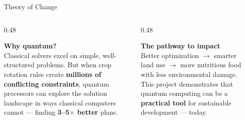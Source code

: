 \documentclass[aspectratio=169,10pt]{beamer}
\begin{document}
\begin{frame}{Theory of Change}

    \vspace{0.4cm}
    \begin{columns}[T]
        \begin{column}{0.48\textwidth}
            \begin{keybox}
                \centering\small
                \textbf{Why quantum?}\\[3pt]
                \scriptsize Classical solvers excel on simple, well-structured problems.
                But when crop rotation rules create \textbf{millions of conflicting constraints},
                quantum processors can explore the solution landscape in ways
                classical computers cannot --- finding \textbf{3--5$\times$ better} plans.
            \end{keybox}
        \end{column}
        \begin{column}{0.48\textwidth}
            \begin{resultbox}
                \centering\small
                \textbf{The pathway to impact}\\[3pt]
                \scriptsize Better optimization $\rightarrow$ smarter land use $\rightarrow$
                more nutritious food with less environmental damage.
                This project demonstrates that quantum computing can be a
                \textbf{practical tool} for sustainable development --- today.
            \end{resultbox}
        \end{column}
    \end{columns}
\end{frame}
\end{document}
